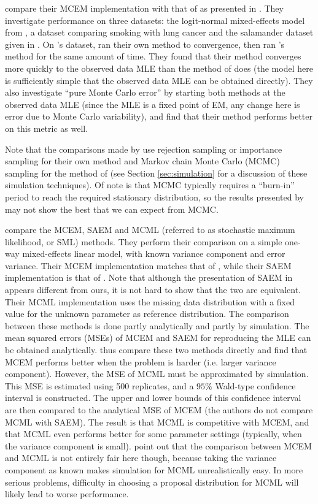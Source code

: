 \documentclass[11pt, oneside]{article}   	%
\begin{document}
\citet{Boo99} compare their MCEM implementation with that of \citet{Wei90} as presented in \citet{McC97}. They investigate performance on three datasets: the logit-normal mixed-effects model from \citet{McC97}, a dataset comparing smoking with lung cancer \citep{Dor54} and the salamander dataset given in \citet{McC89}. On \citeauthor{McC97}'s dataset, \citeauthor{Boo99} ran their own method to convergence, then ran \citeauthor{Wei90}'s method for the same amount of time. They found that their method converges more quickly to the observed data MLE than the method of \citeauthor{Wei90} does (the model here is sufficiently simple that the observed data MLE can be obtained directly). They also investigate ``pure Monte Carlo error'' by starting both methods at the observed data MLE (since the MLE is a fixed point of EM, any change here is error due to Monte Carlo variability), and find that their method performs better on this metric as well.

Note that the comparisons made by \citeauthor{Boo99} use rejection sampling or importance sampling for their own method and Markov chain Monte Carlo (MCMC) sampling for the method of \citet{Wei90} (see Section \ref{sec:simulation} for a discussion of these simulation techniques). Of note is that MCMC typically requires a ``burn-in'' period to reach the required stationary distribution, so the results presented by \citeauthor{Boo99} may not show the best that we can expect from MCMC.

\citet{Boo01} compare the MCEM, SAEM and MCML (referred to as stochastic maximum likelihood, or SML) methods. They perform their comparison on a simple one-way mixed-effects linear model, with known variance component and error variance. Their MCEM implementation matches that of \citet{Boo99}, while their SAEM implementation is that of \citealp{Del99}. Note that although the presentation of SAEM in \citeauthor{Boo01} appears different from ours, it is not hard to show that the two are equivalent. Their MCML implementation uses the missing data distribution with a fixed value for the unknown parameter as reference distribution. The comparison between these methods is done partly analytically and partly by simulation. The mean squared errors (MSEs) of MCEM and SAEM for reproducing the MLE can be obtained analytically. \citeauthor{Boo01} thus compare these two methods directly and find that MCEM performs better when the problem is harder (i.e. larger variance component). However, the MSE of MCML must be approximated by simulation. This MSE is estimated using 500 replicates, and a $95\%$ Wald-type confidence interval is constructed. The upper and lower bounds of this confidence interval are then compared to the analytical MSE of MCEM (the authors do not compare MCML with SAEM). The result is that MCML is competitive with MCEM, and that MCML even performs better for some parameter settings (typically, when the variance component is small). \citeauthor{Boo01} point out that the comparison between MCEM and MCML is not entirely fair here though, because taking the variance component as known makes simulation for MCML unrealistically easy. In more serious problems, difficulty in choosing a proposal distribution for MCML will likely lead to worse performance.
\end{document}
